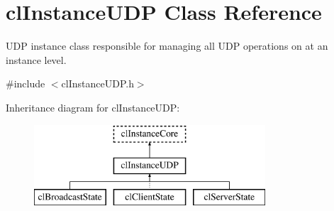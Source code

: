 \hypertarget{classcl_instance_u_d_p}{
\section{clInstanceUDP Class Reference}
\label{classcl_instance_u_d_p}
}


UDP instance class responsible for managing all UDP operations on at an instance level.  




{\ttfamily \#include $<$clInstanceUDP.h$>$}

Inheritance diagram for clInstanceUDP:\begin{figure}[H]
\begin{center}
\leavevmode
\includegraphics[height=3.000000cm]{classcl_instance_u_d_p}
\end{center}
\end{figure}
